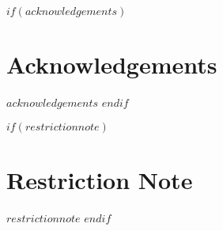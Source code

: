 $if(acknowledgements)$
\chapter*{Acknowledgements}
$acknowledgements$
$endif$



$if(restrictionnote)$
\chapter*{Restriction Note}
$restrictionnote$
$endif$



\cleardoublepage
